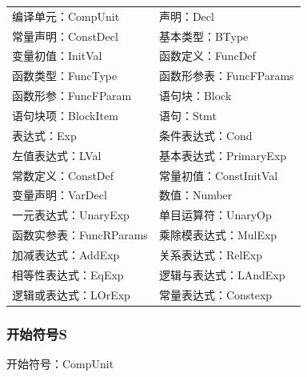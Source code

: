 \documentclass[UTF8,a4paper,10pt]{ctexart}
\begin{document}
\begin{tabular}{p{0.5\linewidth} p{0.5\linewidth}}

编译单元：CompUnit&声明：Decl\\

常量声明：ConstDecl&基本类型：BType\\

变量初值：InitVal&函数定义：FuncDef\\

函数类型：FuncType&函数形参表：FuncFParams\\

函数形参：FuncFParam&语句块：Block\\

语句块项：BlockItem&语句：Stmt\\

表达式：Exp&条件表达式：Cond\\

左值表达式：LVal&基本表达式：PrimaryExp\\

常数定义：ConstDef&常量初值：ConstInitVal\\

变量声明：VarDecl&数值：Number\\

一元表达式：UnaryExp&单目运算符：UnaryOp\\

函数实参表：FuncRParams&乘除模表达式：MulExp\\

加减表达式：AddExp&关系表达式：RelExp\\

相等性表达式：EqExp&逻辑与表达式：LAndExp\\

逻辑或表达式：LOrExp&常量表达式：Constexp\\

\end{tabular}




\subsubsection{开始符号S}
开始符号：CompUnit
\end{document}
